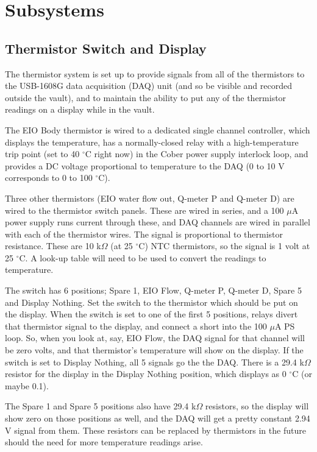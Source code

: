 \chapter{Subsystems}
\section{Thermistor Switch and Display}
The thermistor system is set up to provide signals from all of the thermistors to the USB-1608G data acquisition (DAQ) unit (and so be visible and recorded outside the vault), and to maintain the ability to put any of the thermistor readings on a display while in the vault.

The EIO Body thermistor is wired to a dedicated single channel controller, which displays the temperature, has a normally-closed relay with a high-temperature trip point (set to 40 $^\circ$C right now) in the Cober power supply interlock loop, and provides a DC voltage proportional to temperature to the DAQ (0 to 10 V corresponds to 0 to 100 $^\circ$C).

Three other thermistors (EIO water flow out, Q-meter P and Q-meter D) are wired to the thermistor switch panels. These are wired in series, and a 100 $\mu$A power supply runs current through these, and DAQ channels are wired in parallel with each of the thermistor wires. The signal is proportional to thermistor resistance.  These are 10 k$\Omega$ (at 25 $^\circ$C) NTC thermistors, so the signal is 1 volt at 25 $^\circ$C. A look-up table will need to be used to convert the readings to temperature.

The switch has 6 positions; Spare 1, EIO Flow, Q-meter P, Q-meter D, Spare 5 and Display Nothing. Set the switch to the thermistor which should be put on the display. When the switch is set to one of the first 5 positions, relays divert that thermistor signal to the display, and connect a short into the 100 $\mu$A PS loop. So, when you look at, say, EIO Flow, the DAQ signal for that channel will be zero volts, and that thermistor's temperature will show on the display. If the switch is set to Display Nothing, all 5 signals go the the DAQ. There is a 29.4 k$\Omega$ resistor for the display in the Display Nothing position, which displays as 0 $^\circ$C (or maybe 0.1).

The Spare 1 and Spare 5 positions also have 29.4 k$\Omega$ resistors, so the display will show zero on those positions as well, and the DAQ will get a pretty constant 2.94 V signal from them. These resistors can be replaced by thermistors in the future should the need for more temperature readings arise.

